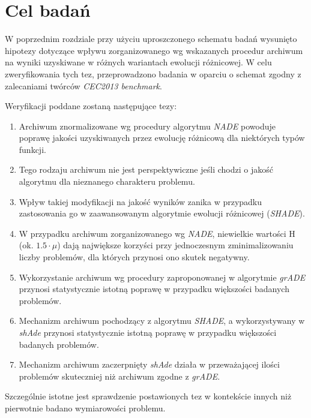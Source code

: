 \documentclass[12pt,a4paper]{report}
\begin{document}
{{{{{{{\section{Cel badań}
\label{CelHipotezy}
\par{
W poprzednim rozdziale przy użyciu uproszczonego schematu badań wysunięto hipotezy dotyczące wpływu zorganizowanego wg wskazanych procedur archiwum na wyniki uzyskiwane w różnych wariantach ewolucji różnicowej. W celu zweryfikowania tych tez, przeprowadzono badania w oparciu o schemat zgodny z zalecaniami twórców \emph{CEC2013 benchmark}.
}
\par{
Weryfikacji poddane zostaną następujące tezy:
\begin{enumerate}
\item Archiwum znormalizowane wg procedury algorytmu \emph{NADE} powoduje poprawę jakości uzyskiwanych przez ewolucję różnicową dla niektórych typów funkcji.
\item Tego rodzaju archiwum nie jest perspektywiczne jeśli chodzi o jakość algorytmu dla nieznanego charakteru problemu.
\item Wpływ takiej modyfikacji na jakość wyników zanika w przypadku zastosowania go w zaawansowanym algorytmie ewolucji różnicowej (\emph{SHADE}).
\item W przypadku archiwum zorganizowanego wg \emph{NADE}, niewielkie wartości H (ok. $1.5 \cdot \mu$) dają największe korzyści przy jednoczesnym zminimalizowaniu liczby problemów, dla których przynosi ono skutek negatywny.
\item Wykorzystanie archiwum wg procedury zaproponowanej w algorytmie \emph{grADE} przynosi statystycznie istotną poprawę w przypadku większości badanych problemów.
\item Mechanizm archiwum pochodzący z algorytmu \emph{SHADE}, a wykorzystywany w \emph{shAde} przynosi statystycznie istotną poprawę w przypadku większości badanych problemów.
\item Mechanizm archiwum zaczerpnięty \emph{shAde} działa w przeważającej ilości problemów skuteczniej niż archiwum zgodne z \emph{grADE}.
\end{enumerate}
}
\par{
Szczególnie istotne jest sprawdzenie postawionych tez w kontekście innych niż pierwotnie badano wymiarowości problemu.
}

}}}}}}}
\end{document}
